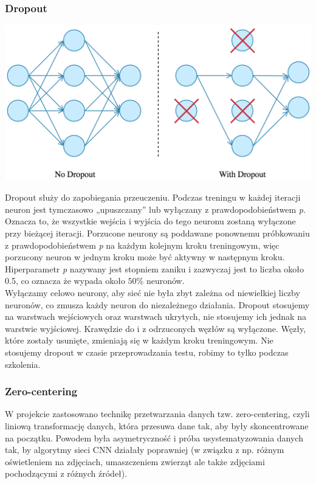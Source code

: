 \documentclass[12pt,a4paper]{article}
\begin{document}
    \subsubsection{Dropout}
        \begin{center}
            \includegraphics[scale=0.34]{dropout.png}
        \end{center}
        
        Dropout służy do zapobiegania przeuczeniu. Podczas treningu w każdej iteracji neuron jest tymczasowo „upuszczany” lub wyłączany z prawdopodobieństwem \textit{p}. Oznacza to, że wszystkie wejścia i wyjścia do tego neuronu zostaną wyłączone przy bieżącej iteracji. Porzucone neurony są poddawane ponownemu próbkowaniu z prawdopodobieństwem \textit{p} na każdym kolejnym kroku treningowym, więc porzucony neuron w jednym kroku może być aktywny w następnym kroku. Hiperparametr \textit{p} nazywany jest stopniem zaniku i zazwyczaj jest to liczba około 0.5, co oznacza że wypada około $50\%$ neuronów.
        \\
    
        Wyłączamy celowo neurony, aby sieć nie była zbyt zależna od niewielkiej liczby neuronów, co zmusza każdy neuron do niezależnego działania. Dropout stosujemy na warstwach wejściowych oraz warstwach ukrytych, nie stosujemy ich jednak na warstwie wyjściowej. Krawędzie do i z odrzuconych węzłów są wyłączone. Węzły, które zostały usunięte, zmieniają się w każdym kroku treningowym. Nie stosujemy dropout w czasie przeprowadzania testu, robimy to tylko podczas szkolenia.
    \subsubsection{Zero-centering}
    
    W projekcie zastosowano technikę przetwarzania danych tzw. zero-centering, czyli liniową transformację danych, która przesuwa dane tak, aby były skoncentrowane na początku. Powodem była asymetryczność i próba usystematyzowania danych tak, by algorytmy sieci CNN działały poprawniej (w związku z np. różnym oświetleniem na zdjęciach, umaszczeniem zwierząt ale także zdjęciami pochodzącymi z różnych źródeł).
    \\
    \newpage
    
\end{document}
